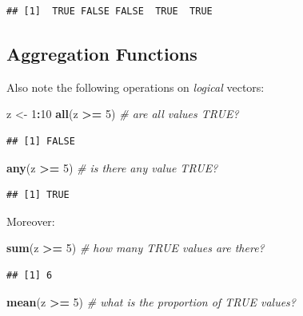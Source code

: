 \documentclass[10pt,b5paper,krantz1]{krantz}
\newenvironment{Shaded}{\begin{snugshade}}{\end{snugshade}}
\newcommand{\CommentTok}[1]{\textcolor[rgb]{0.37,0.37,0.37}{\textit{#1}}}
\newcommand{\DecValTok}[1]{\textcolor[rgb]{0.06,0.06,0.06}{#1}}
\newcommand{\KeywordTok}[1]{\textcolor[rgb]{0.27,0.27,0.27}{\textbf{#1}}}
\newcommand{\NormalTok}[1]{#1}
\newcommand{\OperatorTok}[1]{\textcolor[rgb]{0.43,0.43,0.43}{\textbf{#1}}}
\newcommand{\StringTok}[1]{\textcolor[rgb]{0.5,0.5,0.5}{#1}}
\begin{document}
\begin{verbatim}
## [1]  TRUE FALSE FALSE  TRUE  TRUE
\end{verbatim}

\hypertarget{aggregation-functions-1}{%
\subsection{Aggregation Functions}\label{aggregation-functions-1}}

Also note the following operations on \emph{logical} vectors:

\begin{Shaded}
\begin{Highlighting}[]
\NormalTok{z <-}\StringTok{ }\DecValTok{1}\OperatorTok{:}\DecValTok{10}
\KeywordTok{all}\NormalTok{(z }\OperatorTok{>=}\StringTok{ }\DecValTok{5}\NormalTok{) }\CommentTok{# are all values TRUE?}
\end{Highlighting}
\end{Shaded}

\begin{verbatim}
## [1] FALSE
\end{verbatim}

\begin{Shaded}
\begin{Highlighting}[]
\KeywordTok{any}\NormalTok{(z }\OperatorTok{>=}\StringTok{ }\DecValTok{5}\NormalTok{) }\CommentTok{# is there any value TRUE?}
\end{Highlighting}
\end{Shaded}

\begin{verbatim}
## [1] TRUE
\end{verbatim}

Moreover:

\begin{Shaded}
\begin{Highlighting}[]
\KeywordTok{sum}\NormalTok{(z }\OperatorTok{>=}\StringTok{ }\DecValTok{5}\NormalTok{) }\CommentTok{# how many TRUE values are there?}
\end{Highlighting}
\end{Shaded}

\begin{verbatim}
## [1] 6
\end{verbatim}

\begin{Shaded}
\begin{Highlighting}[]
\KeywordTok{mean}\NormalTok{(z }\OperatorTok{>=}\StringTok{ }\DecValTok{5}\NormalTok{) }\CommentTok{# what is the proportion of TRUE values?}
\end{Highlighting}
\end{Shaded}
\end{document}

